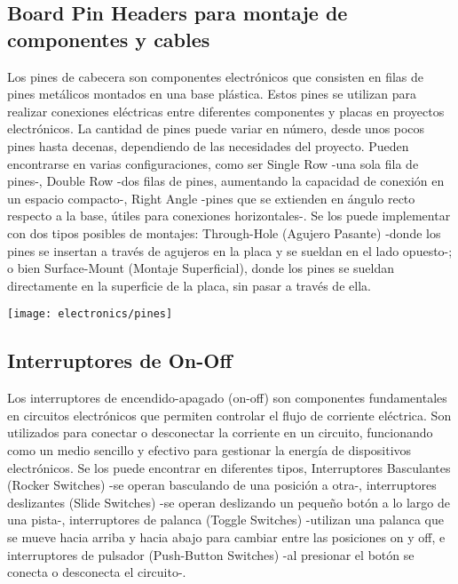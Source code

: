 \subsection{Board Pin Headers para montaje de componentes y cables}
Los pines de cabecera son componentes electrónicos que consisten en filas de pines metálicos montados en una base plástica. Estos pines se utilizan para realizar conexiones eléctricas entre diferentes componentes y placas en proyectos electrónicos. La cantidad de pines puede variar en número, desde unos pocos pines hasta decenas, dependiendo de las necesidades del proyecto. Pueden encontrarse en varias configuraciones, como ser Single Row -una sola fila de pines-, Double Row -dos filas de pines, aumentando la capacidad de conexión en un espacio compacto-, Right Angle -pines que se extienden en ángulo recto respecto a la base, útiles para conexiones horizontales-. Se los puede implementar con dos tipos posibles de montajes: Through-Hole (Agujero Pasante) -donde los pines se insertan a través de agujeros en la placa y se sueldan en el lado opuesto-; o bien Surface-Mount (Montaje Superficial), donde los pines se sueldan directamente en la superficie de la placa, sin pasar a través de ella.

\begin{center}
    \centering
    \texttt{[image: electronics/pines]}
    \label{fig:pines}
\end{center}

\subsection{Interruptores de On-Off}
Los interruptores de encendido-apagado (on-off) son componentes fundamentales en circuitos electrónicos que permiten controlar el flujo de corriente eléctrica. Son utilizados para conectar o desconectar la corriente en un circuito, funcionando como un medio sencillo y efectivo para gestionar la energía de dispositivos electrónicos. Se los puede encontrar en diferentes tipos,     Interruptores Basculantes (Rocker Switches) -se operan basculando de una posición a otra-, interruptores deslizantes (Slide Switches) -se operan deslizando un pequeño botón a lo largo de una pista-, interruptores de palanca (Toggle Switches) -utilizan una palanca que se mueve hacia arriba y hacia abajo para cambiar entre las posiciones on y off, e interruptores de pulsador (Push-Button Switches) -al presionar el botón se conecta o desconecta el circuito-.  

